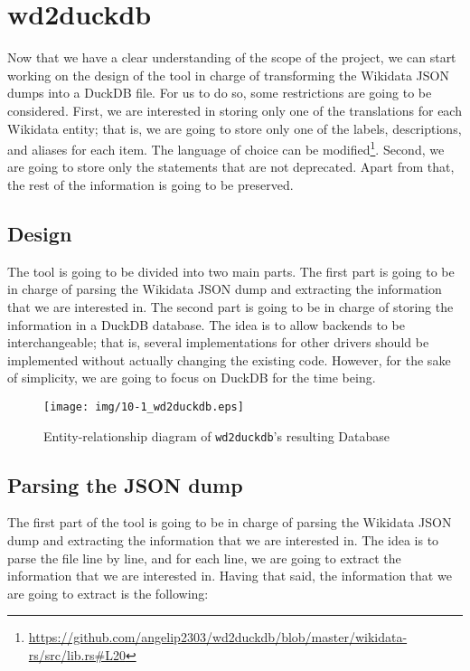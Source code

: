\section{wd2duckdb}

Now that we have a clear understanding of the scope of the project, we can start working on the design of the tool in charge of transforming the Wikidata JSON dumps into a DuckDB file. For us to do so, some restrictions are going to be considered. First, we are interested in storing only one of the translations for each Wikidata entity; that is, we are going to store only one of the labels, descriptions, and aliases for each item. The language of choice can be modified\footnote{\url{https://github.com/angelip2303/wd2duckdb/blob/master/wikidata-rs/src/lib.rs\#L20}}. Second, we are going to store only the statements that are not deprecated. Apart from that, the rest of the information is going to be preserved.

\label{section:wd2duckdb_design}
\subsection{Design}

The tool is going to be divided into two main parts. The first part is going to be in charge of parsing the Wikidata JSON dump and extracting the information that we are interested in. The second part is going to be in charge of storing the information in a DuckDB database. The idea is to allow backends to be interchangeable; that is, several implementations for other drivers should be implemented without actually changing the existing code. However, for the sake of simplicity, we are going to focus on DuckDB for the time being.

\begin{figure}[ht]
    \centering
    \texttt{[image: img/10-1\_wd2duckdb.eps]}
    \caption{Entity-relationship diagram of \texttt{wd2duckdb}'s resulting Database}
\end{figure}%

\subsection{Parsing the JSON dump}

The first part of the tool is going to be in charge of parsing the Wikidata JSON dump and extracting the information that we are interested in. The idea is to parse the file line by line, and for each line, we are going to extract the information that we are interested in. Having that said, the information that we are going to extract is the following:

